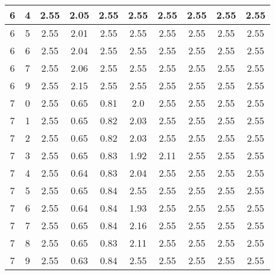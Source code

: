 \begin{longtable}{|c|c||c||c|c|c|c||c|c|c|}
	6 & 4 & 2.55 & 2.05 & 2.55 & 2.55 & 2.55 & 2.55 & 2.55 & 2.55 \\ \hline
	6 & 5 & 2.55 & 2.01 & 2.55 & 2.55 & 2.55 & 2.55 & 2.55 & 2.55 \\ \hline
	6 & 6 & 2.55 & 2.04 & 2.55 & 2.55 & 2.55 & 2.55 & 2.55 & 2.55 \\ \hline
	6 & 7 & 2.55 & 2.06 & 2.55 & 2.55 & 2.55 & 2.55 & 2.55 & 2.55 \\ \hline
	6 & 9 & 2.55 & 2.15 & 2.55 & 2.55 & 2.55 & 2.55 & 2.55 & 2.55 \\ \hline
	7 & 0 & 2.55 & 0.65 & 0.81 & 2.0 & 2.55 & 2.55 & 2.55 & 2.55 \\ \hline
	7 & 1 & 2.55 & 0.65 & 0.82 & 2.03 & 2.55 & 2.55 & 2.55 & 2.55 \\ \hline
	7 & 2 & 2.55 & 0.65 & 0.82 & 2.03 & 2.55 & 2.55 & 2.55 & 2.55 \\ \hline
	7 & 3 & 2.55 & 0.65 & 0.83 & 1.92 & 2.11 & 2.55 & 2.55 & 2.55 \\ \hline
	7 & 4 & 2.55 & 0.64 & 0.83 & 2.04 & 2.55 & 2.55 & 2.55 & 2.55 \\ \hline
	7 & 5 & 2.55 & 0.65 & 0.84 & 2.55 & 2.55 & 2.55 & 2.55 & 2.55 \\ \hline
	7 & 6 & 2.55 & 0.64 & 0.84 & 1.93 & 2.55 & 2.55 & 2.55 & 2.55 \\ \hline
	7 & 7 & 2.55 & 0.65 & 0.84 & 2.16 & 2.55 & 2.55 & 2.55 & 2.55 \\ \hline
	7 & 8 & 2.55 & 0.65 & 0.83 & 2.11 & 2.55 & 2.55 & 2.55 & 2.55 \\ \hline
	7 & 9 & 2.55 & 0.63 & 0.84 & 2.55 & 2.55 & 2.55 & 2.55 & 2.55 \\ \hline
\end{longtable}
\clearpage{}
